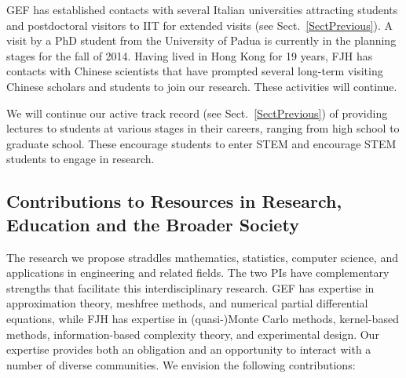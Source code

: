 \begin{description}[leftmargin=2.5ex]
\item[Supervising Visitors]
GEF has established contacts with several Italian universities attracting students and postdoctoral visitors to IIT for extended visits (see Sect.~\ref{SectPrevious}). A visit by a PhD student from the University of Padua is currently in the planning stages for the fall of 2014.  Having lived in Hong Kong for 19 years, FJH has contacts with Chinese scientists that have prompted several long-term visiting Chinese scholars and students to join our research.  These activities will continue.

\item[Giving Short Courses and Invited Lectures]
We will continue our active track record (see Sect.~\ref{SectPrevious}) of providing lectures to students at various stages in their careers, ranging from high school to graduate school. These encourage students to enter STEM and encourage STEM students to engage in research.

\end{description}

\subsection{Contributions to Resources in Research, Education and the Broader Society}

The research we propose straddles mathematics, statistics, computer science, and applications in engineering and related fields.  The two PIs have complementary strengths that facilitate this interdisciplinary research.  GEF has expertise in approximation theory, meshfree methods, and numerical partial differential equations, while FJH has expertise in (quasi-)Monte Carlo methods, kernel-based methods, information-based complexity theory, and experimental design. Our expertise provides both an obligation and an opportunity to interact with a number of diverse communities. We envision the following contributions:

